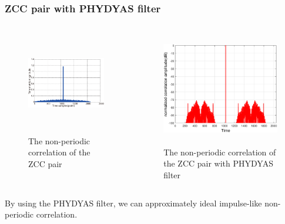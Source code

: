\documentclass[8 pt]{beamer} %
\begin{document}
\begin{frame}
\frametitle{ZCC pair with PHYDYAS filter}
\begin{columns}[c]
\begin{figure}[htb]
        \centering\includegraphics[width=5cm,height=4.5cm]{the_autocorrelation_of_the_zcc_pair.eps}
        \caption{The non-periodic correlation of the ZCC pair}\label{fig:ZCCauto}
\end{figure}

\begin{figure}[htb]
        \centering\includegraphics[width=6cm,height=5cm]{PHYDYAS_correlation.eps}
        \caption{ The non-periodic correlation of the ZCC pair with PHYDYAS filter}\label{fig:ZCCauto}
\end{figure}
\end{columns}
By using the PHYDYAS filter, we can approximately ideal impulse-like non-periodic correlation. %

\end{frame}
\end{document}
